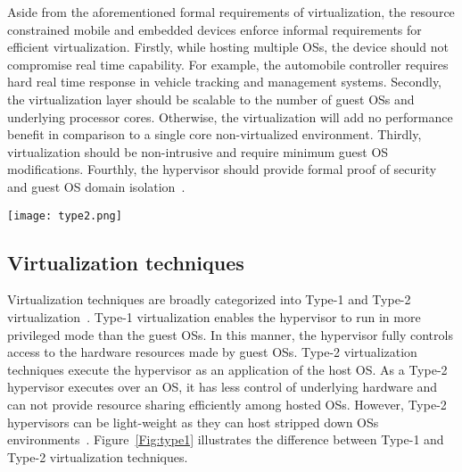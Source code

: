 \documentclass[journal, 10pt]{IEEEtran}
\begin{document}
Aside from the aforementioned formal requirements of virtualization, the resource constrained mobile and embedded devices enforce informal requirements for efficient virtualization. Firstly, while hosting multiple OSs, the device should not compromise real time capability. For example, the automobile controller requires hard real time response in vehicle tracking and management systems. Secondly, the virtualization layer should be scalable to the number of guest OSs and underlying processor cores. Otherwise, the virtualization will add no performance benefit in comparison to a single core non-virtualized environment. Thirdly, virtualization should be non-intrusive and require minimum guest OS modifications. Fourthly, the hypervisor should provide formal proof of security and guest OS domain isolation~\cite{Heiser2011}. 
\begin{figure*}
\centering
\texttt{[image: type2.png]}
\caption {Full, para, and DBT based virtualization techniques}
\label{Fig:type1}
\end{figure*}
\subsection{Virtualization techniques}\label{sec:virt}
Virtualization techniques are broadly categorized into Type-1 and Type-2 virtualization~\cite{Ding2012}. Type-1 virtualization enables the hypervisor to run in more privileged mode than the guest OSs. In this manner, the hypervisor fully controls access to the hardware resources made by guest OSs. Type-2 virtualization techniques execute the hypervisor as an application of the host OS. As a Type-2 hypervisor executes over an OS, it has less control of underlying hardware and can not provide resource sharing efficiently among hosted OSs. However, Type-2 hypervisors can be light-weight as they can host stripped down OSs environments~\cite{Barr2010}. Figure~\ref{Fig:type1} illustrates the difference between Type-1 and Type-2 virtualization techniques. 
\end{document}
